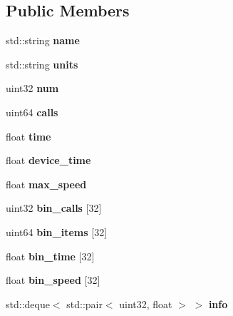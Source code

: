\subsection*{Public Members}
\begin{DoxyCompactItemize}
\item 
\mbox{\label{structcugar_1_1_time_series_acafafa4a5704deb8e8a5ad57d0e453e8}} 
std\+::string {\bfseries name}
\item 
\mbox{\label{structcugar_1_1_time_series_ae63db7f4a561b5c3a3979f802b7b52a0}} 
std\+::string {\bfseries units}
\item 
\mbox{\label{structcugar_1_1_time_series_aba9fcac6928f74efccb093d7582b45c4}} 
uint32 {\bfseries num}
\item 
\mbox{\label{structcugar_1_1_time_series_a917a14de8fe3fa646496a780bc7ff20a}} 
uint64 {\bfseries calls}
\item 
\mbox{\label{structcugar_1_1_time_series_ae676a0b8e9c2f2ed7e831cb82d8670eb}} 
float {\bfseries time}
\item 
\mbox{\label{structcugar_1_1_time_series_a192f838667b82c6f7bd34726e6a51abc}} 
float {\bfseries device\+\_\+time}
\item 
\mbox{\label{structcugar_1_1_time_series_a03b8ed43834d782bfebe9727de3be417}} 
float {\bfseries max\+\_\+speed}
\item 
\mbox{\label{structcugar_1_1_time_series_af0c518dff882eb255cd79aa3ab2018f7}} 
uint32 {\bfseries bin\+\_\+calls} \mbox{[}32\mbox{]}
\item 
\mbox{\label{structcugar_1_1_time_series_af73d2692e4e8bf3ca8efa7f7b84e4782}} 
uint64 {\bfseries bin\+\_\+items} \mbox{[}32\mbox{]}
\item 
\mbox{\label{structcugar_1_1_time_series_a8d180b3902ad8d6565e4b5a386daf2a8}} 
float {\bfseries bin\+\_\+time} \mbox{[}32\mbox{]}
\item 
\mbox{\label{structcugar_1_1_time_series_afb534083663714d21e3ff38662cccae2}} 
float {\bfseries bin\+\_\+speed} \mbox{[}32\mbox{]}
\item 
\mbox{\label{structcugar_1_1_time_series_a7f9f98040a50036c133248696ecdf044}} 
std\+::deque$<$ std\+::pair$<$ uint32, float $>$ $>$ {\bfseries info}
\end{DoxyCompactItemize}


